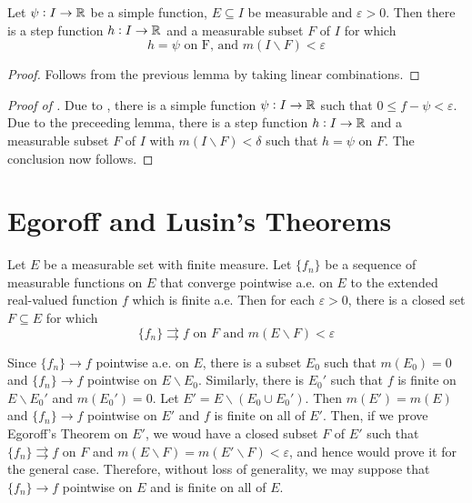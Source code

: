 \begin{lemma}
    Let $\psi: I\to\mathbb{R}$ be a simple function, $E\subseteq I$ be measurable and $\varepsilon > 0$. Then there is a step function $h: I\to\mathbb{R}$ and a measurable subset $F$ of $I$ for which 
    \begin{equation*}
        h = \psi\text{ on F, and } m(I\backslash F) < \varepsilon
    \end{equation*}
\end{lemma}
\begin{proof}
    Follows from the previous lemma by taking linear combinations.
\end{proof}

\begin{proof}[Proof of ]
    Due to , there is a simple function $\psi: I\to\mathbb{R}$ such that $0\le f - \psi < \varepsilon$. Due to the preceeding lemma, there is a step function $h: I\to\mathbb{R}$ and a measurable subset $F$ of $I$ with $m(I\backslash F) < \delta$ such that $h = \psi$ on $F$. The conclusion now follows.
\end{proof}


\section{Egoroff and Lusin's Theorems}

\begin{theorem}[Egoroff]
    Let $E$ be a measurable set with finite measure. Let $\{f_n\}$ be a sequence of measurable functions on $E$ that converge pointwise a.e. on $E$ to the extended real-valued function $f$ which is finite a.e. Then for each $\varepsilon > 0$, there is a closed set $F\subseteq E$ for which 
    \begin{equation*}
        \{f_n\}\rightrightarrows f\text{ on $F$ and }m(E\backslash F) < \varepsilon
    \end{equation*}
\end{theorem}

Since $\{f_n\}\to f$ pointwise a.e. on $E$, there is a subset $E_0$ such that $m(E_0) = 0$ and $\{f_n\}\to f$ pointwise on $E\backslash E_0$. Similarly, there is $E_0'$ such that $f$ is finite on $E\backslash E_0'$ and $m(E_0') = 0$. Let $E' = E\backslash(E_0\cup E_0')$. Then $m(E') = m(E)$ and $\{f_n\}\to f$ pointwise on $E'$ and $f$ is finite on all of $E'$. Then, if we prove Egoroff's Theorem on $E'$, we woud have a closed subset $F$ of $E'$ such that $\{f_n\}\rightrightarrows f$ on $F$ and $m(E\backslash F) = m(E'\backslash F) < \varepsilon$, and hence would prove it for the general case. Therefore, without loss of generality, we may suppose that $\{f_n\}\to f$ pointwise on $E$ and is finite on all of $E$.

